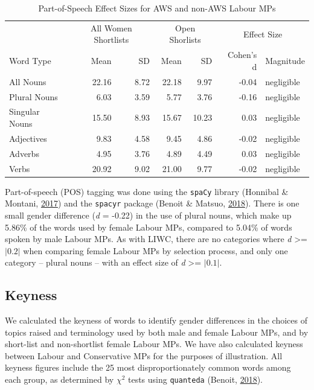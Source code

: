 \documentclass[]{article}
\theoremstyle{definition}
\theoremstyle{definition}
\theoremstyle{definition}
\theoremstyle{remark}
\begin{document}
\begin{table}[H]
\begin{table}[H]
\begin{table}[H]
\begin{table}[H]
\begin{table}[H]
\begin{table}[H]
\begin{table}[H]
\begin{table}[H]
\begin{table}
\caption{\label{tab:pos-sl-table}Part-of-Speech Effect Sizes for AWS and non-AWS Labour MPs}
\centering
\begin{tabular}[t]{lrrrrrl}
\toprule
\multicolumn{1}{c}{ } & \multicolumn{2}{c}{All Women Shortlists} & \multicolumn{2}{c}{Open Shorlists} & \multicolumn{2}{c}{Effect Size} \\
\cmidrule(l{2pt}r{2pt}){2-3} \cmidrule(l{2pt}r{2pt}){4-5} \cmidrule(l{2pt}r{2pt}){6-7}
Word Type & Mean & SD & Mean & SD & Cohen's d & Magnitude\\
\midrule
All Nouns & 22.16 & 8.72 & 22.18 & 9.97 & -0.04 & negligible\\
\hspace{1em}Plural Nouns & 6.03 & 3.59 & 5.77 & 3.76 & -0.16 & negligible\\
\hspace{1em}Singular Nouns & 15.50 & 8.93 & 15.67 & 10.23 & 0.03 & negligible\\
Adjectives & 9.83 & 4.58 & 9.45 & 4.86 & -0.02 & negligible\\
Adverbs & 4.95 & 3.76 & 4.89 & 4.49 & 0.03 & negligible\\
Verbs & 20.92 & 9.02 & 21.00 & 9.77 & -0.02 & negligible\\
\bottomrule
\end{tabular}
\end{table}

Part-of-speech (POS) tagging was done using the \texttt{spaCy} library
(Honnibal \& Montani, \protect\hyperlink{ref-honnibal2017}{2017}) and
the \texttt{spacyr} package (Benoit \& Matsuo,
\protect\hyperlink{ref-benoit2018a}{2018}). There is one small gender
difference (\emph{d} = -0.22) in the use of plural nouns, which make up
5.86\% of the words used by female Labour MPs, compared to 5.04\% of
words spoken by male Labour MPs. As with LIWC, there are no categories
where \emph{d} \textgreater{}= \(|0.2|\) when comparing female Labour
MPs by selection process, and only one category -- plural nouns -- with
an effect size of \emph{d} \textgreater{}= \(|0.1|\).

\hypertarget{keyness}{%
\subsection{Keyness}\label{keyness}}

We calculated the keyness of words to identify gender differences in the
choices of topics raised and terminology used by both male and female
Labour MPs, and by short-list and non-shortlist female Labour MPs. We
have also calculated keyness between Labour and Conservative MPs for the
purposes of illustration. All keyness figures include the 25 most
disproportionately common words among each group, as determined by
\({\chi}^2\) tests using \texttt{quanteda} (Benoit,
\protect\hyperlink{ref-benoit2018}{2018}).


\end{table}
\end{table}
\end{table}
\end{table}
\end{table}
\end{table}
\end{table}
\end{table}
\end{document}
